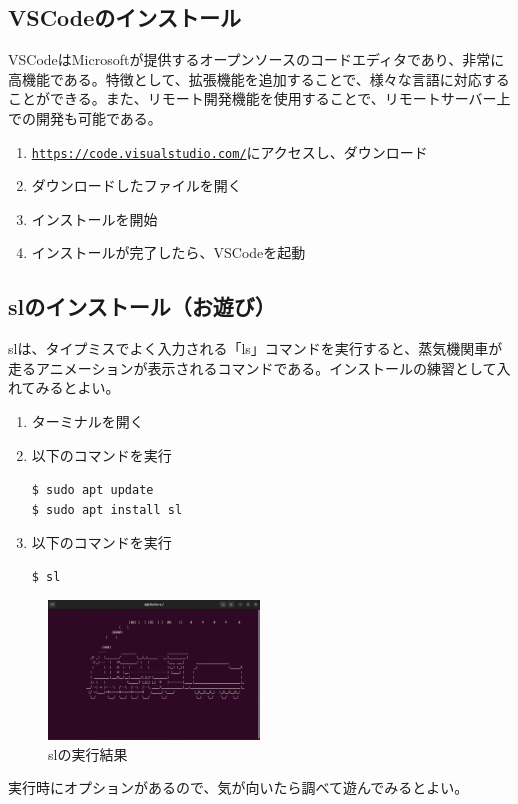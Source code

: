 \documentclass[a4paper, 11pt, dvipdfmx]{jsarticle}
\begin{document}
\subsection{VSCodeのインストール}
  VSCodeはMicrosoftが提供するオープンソースのコードエディタであり、非常に高機能である。特徴として、拡張機能を追加することで、様々な言語に対応することができる。また、リモート開発機能を使用することで、リモートサーバー上での開発も可能である。
  \begin{enumerate}
    \item \href{https://code.visualstudio.com/}{\texttt{https://code.visualstudio.com/}}にアクセスし、ダウンロード
    \item ダウンロードしたファイルを開く
    \item インストールを開始
    \item インストールが完了したら、VSCodeを起動
  \end{enumerate}

\subsection{slのインストール（お遊び）} 
  slは、タイプミスでよく入力される「ls」コマンドを実行すると、蒸気機関車が走るアニメーションが表示されるコマンドである。インストールの練習として入れてみるとよい。
  \begin{enumerate}
    \item ターミナルを開く
    \item 以下のコマンドを実行
    \begin{terminalbox}
      \verb|$ sudo apt update|\\
      \verb|$ sudo apt install sl|
    \end{terminalbox}
    \item 以下のコマンドを実行
    \begin{terminalbox}
      \verb|$ sl|
    \end{terminalbox}
  \end{enumerate}
  \begin{figure}[H]
    \centering
    \includegraphics[width=0.5\textwidth]{images/linux-server/3_4-sl.png}
    \caption{slの実行結果}
    \label{fig:sl}
  \end{figure}
  実行時にオプションがあるので、気が向いたら調べて遊んでみるとよい。
\end{document}
